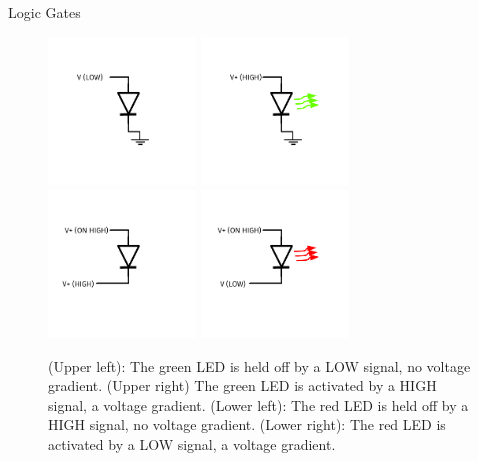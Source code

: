 \documentclass{beamer}
\begin{document}
\begin{frame}{Logic Gates}
\begin{figure}
\centering
\includegraphics[width=0.35\textwidth,trim=1cm 3cm 1cm 3cm,clip=true]{figures/GreenLEDOff.pdf}
\includegraphics[width=0.35\textwidth,trim=1cm 3cm 1cm 3cm,clip=true]{figures/GreenLEDOn.pdf} \\
\includegraphics[width=0.35\textwidth,trim=1cm 3cm 1cm 3cm,clip=true]{figures/RedLEDOff.pdf}
\includegraphics[width=0.35\textwidth,trim=1cm 3cm 1cm 3cm,clip=true]{figures/RedLEDOn.pdf}
\caption{\label{fig:diode3} \small (Upper left): The green LED is held off by a LOW signal, no voltage gradient. (Upper right) The green LED is activated by a HIGH signal, a voltage gradient.  (Lower left): The red LED is held off by a HIGH signal, no voltage gradient.  (Lower right): The red LED is activated by a LOW signal, a voltage gradient.}
\end{figure}
\end{frame}
\end{document}
